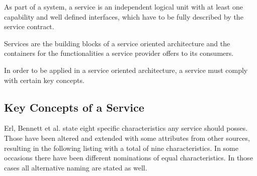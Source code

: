 \begin{myquote}
	As part of a system, a service is an independent logical unit with at least one capability and well defined interfaces, which have to be fully described by the service contract.

	Services are the building blocks of a service oriented architecture and the containers for the functionalities a service provider offers to its consumers.

	In order to be applied in a service oriented architecture, a service must comply with certain key concepts.
\end{myquote}



\subsection{Key Concepts of a Service}
\label{sec:service-concepts}
Erl, Bennett et al. \cite[p.27]{erl2011} state eight specific characteristics any service should posses. Those have been altered and extended with some attributes from other sources, resulting in the following listing with a total of nine characteristics. In some occasions there have been different nominations of equal characteristics. In those cases all alternative naming are stated as well.

